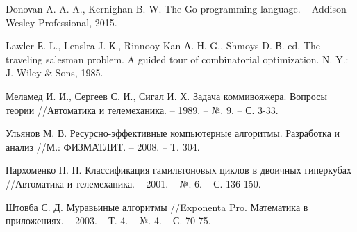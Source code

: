 \renewcommand{\bibname}{Список использованных источников}
\begin{thebibliography}{100}






 Donovan A. A. A., Kernighan B. W. The Go programming language. – Addison-Wesley Professional, 2015.



 Lawler Е. L., Lenslra J. К., Rinnooy Kan А. Н. G., Shmoys D. В. ed. The traveling salesman problem. A guided tour of combinatorial optimization. N. Y.: J. Wiley \& Sons, 1985.

 Меламед И. И., Сергеев С. И., Сигал И. Х. Задача коммивояжера. Вопросы теории //Автоматика и телемеханика. – 1989. – №. 9. – С. 3-33.

 Ульянов М. В. Ресурсно-эффективные компьютерные алгоритмы. Разработка и анализ //М.: ФИЗМАТЛИТ. – 2008. – Т. 304.

 Пархоменко П. П. Классификация гамильтоновых циклов в двоичных гиперкубах //Автоматика и телемеханика. – 2001. – №. 6. – С. 136-150.


 Штовба С. Д. Муравьиные алгоритмы //Exponenta Pro. Математика в приложениях. – 2003. – Т. 4. – №. 4. – С. 70-75.


\end{thebibliography}

\newpage